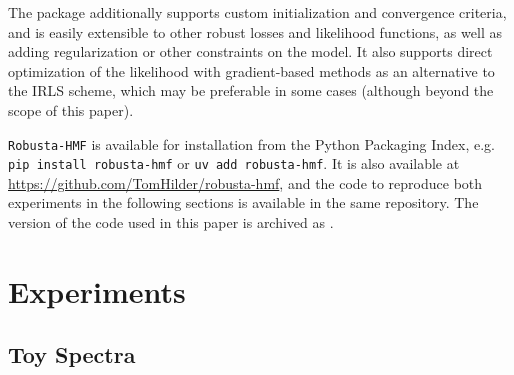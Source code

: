 \documentclass[onecolumn,floatfix,linenumbers,trackchanges]{aastex631}
\providecommand{\added}{}\renewcommand{\added}[1]{{\color{blue}#1}}
\begin{document}
The package additionally supports custom initialization and convergence criteria, and is easily extensible to other robust losses and likelihood functions, as well as adding regularization or other constraints on the model.
It also supports direct optimization of the likelihood with gradient-based methods as an alternative to the IRLS scheme, which may be preferable in some cases (although beyond the scope of this paper).

\texttt{Robusta-HMF} is available for installation from the Python Packaging Index, e.g. \texttt{pip install robusta-hmf} or \texttt{uv add robusta-hmf}.
It is also available at \url{https://github.com/TomHilder/robusta-hmf}, and the code to reproduce both experiments in the following sections is available in the same repository.
\added{The version of the code used in this paper is archived as \citet{hilder2026}.}

\section{Experiments} \label{sec:experiments}

\subsection{Toy Spectra} \label{sec:toy}
\end{document}
